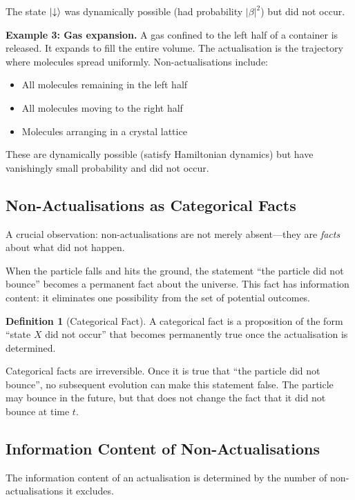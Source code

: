 \documentclass[twocolumn,10pt]{article}
\theoremstyle{definition}
\newtheorem{definition}[theorem]{Definition}
\theoremstyle{remark}
\begin{document}
The state $\ket{\downarrow}$ was dynamically possible (had probability $|\beta|^2$) but did not occur.

\textbf{Example 3: Gas expansion.} A gas confined to the left half of a container is released. It expands to fill the entire volume. The actualisation is the trajectory where molecules spread uniformly. Non-actualisations include:
\begin{itemize}
\item All molecules remaining in the left half
\item All molecules moving to the right half
\item Molecules arranging in a crystal lattice
\end{itemize}

These are dynamically possible (satisfy Hamiltonian dynamics) but have vanishingly small probability and did not occur.

\subsection{Non-Actualisations as Categorical Facts}

A crucial observation: non-actualisations are not merely absent—they are \textit{facts} about what did not happen.

When the particle falls and hits the ground, the statement ``the particle did not bounce'' becomes a permanent fact about the universe. This fact has information content: it eliminates one possibility from the set of potential outcomes.

\begin{definition}[Categorical Fact]
A categorical fact is a proposition of the form ``state $X$ did not occur'' that becomes permanently true once the actualisation is determined.
\end{definition}

Categorical facts are irreversible. Once it is true that ``the particle did not bounce'', no subsequent evolution can make this statement false. The particle may bounce in the future, but that does not change the fact that it did not bounce at time $t$.

\subsection{Information Content of Non-Actualisations}

The information content of an actualisation is determined by the number of non-actualisations it excludes.
\end{document}
